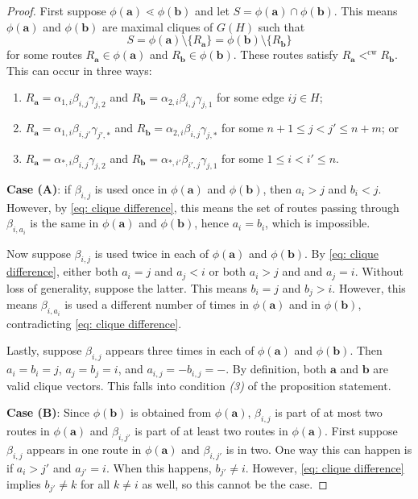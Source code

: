\documentclass[10pt,a4paper]{amsart}
\DeclareMathOperator{\cw}{cw}
\newcommand\ba{\mathbf{a}}
\newcommand\bb{\mathbf{b}}
\begin{document}
\begin{proof}
    First suppose $\phi(\ba) \lessdot \phi(\bb)$ and let $S = \phi(\ba) \cap \phi(\bb)$.
    This means $\phi(\ba)$ and $\phi(\bb)$ are maximal cliques of $G(H)$ such that
    \begin{equation}\label{eq: clique difference}
       S = \phi(\ba) \setminus \{R_\ba\} = \phi(\bb) \setminus \{R_\bb\}
    \end{equation}
    for some routes $R_\ba \in \phi(\ba)$ and $R_\bb \in \phi(\bb)$.
    These routes satisfy $R_\ba <^{\cw} R_\bb$.
    This can occur in three ways:
    \begin{enumerate}
        \item[(A)] $R_\ba = \alpha_{1,i}\beta_{i,j}\gamma_{j,2}$ and $R_\bb = \alpha_{2,i}\beta_{i,j}\gamma_{j,1}$ for some edge $ij \in H$;
        \item[(B)] $R_\ba = \alpha_{1,i}\beta_{i,j'}\gamma_{j',*}$ and $R_\bb = \alpha_{2,i}\beta_{i,j}\gamma_{j,*}$ for some $n+1 \leq j < j' \leq n+m$; or
        \item[(C)] $R_\ba = \alpha_{*,i}\beta_{i,j}\gamma_{j,2}$ and $R_\bb = \alpha_{*,i'}\beta_{i',j}\gamma_{j,1}$ for some $1 \leq i < i' \leq n$. 
    \end{enumerate}

    \textbf{Case (A)}: if $\beta_{i,j}$ is used once in $\phi(\ba)$ and $\phi(\bb)$, then $a_i > j$ and $b_i < j$.
    However, by \eqref{eq: clique difference}, this means the set of routes passing through $\beta_{i,a_i}$ is the same in $\phi(\ba)$ and $\phi(\bb)$, hence $a_i = b_i$, which is impossible. 
    
    Now suppose $\beta_{i,j}$ is used twice in each of $\phi(\ba)$ and $\phi(\bb)$.
    By \eqref{eq: clique difference}, either both $a_i = j$ and $a_j< i$ or both $a_i>j$ and and $a_j = i$. 
    Without loss of generality, suppose the latter. 
    This means $b_i = j$ and $b_j > i$.
    However, this means $\beta_{i,a_i}$ is used a different number of times in $\phi(\ba)$ and in $\phi(\bb)$, contradicting \eqref{eq: clique difference}.

    Lastly, suppose $\beta_{i,j}$ appears three times in each of $\phi(\ba)$ and $\phi(\bb)$.
    Then $a_i = b_i = j$, $a_j = b_j = i$, and $a_{i,j} = -b_{i,j} = -$.
    By definition, both $\ba$ and $\bb$ are valid clique vectors.
    This falls into condition \emph{(3)} of the proposition statement.

    \textbf{Case (B)}: Since $\phi(\bb)$ is obtained from $\phi(\ba)$, $\beta_{i,j}$ is part of at most two routes in $\phi(\ba)$ and $\beta_{i,j'}$ is part of at least two routes in $\phi(\ba)$.
    First suppose $\beta_{i,j}$ appears in one route in $\phi(\ba)$ and $\beta_{i,j'}$ is in two.
    One way this can happen is if $a_i > j'$ and $a_{j'} = i$.
    When this happens, $b_{j'} \neq i$.
    However, \eqref{eq: clique difference} implies $b_{j'} \neq k$ for all $k \neq i$ as well, so this cannot be the case.


\end{proof}
\end{document}
